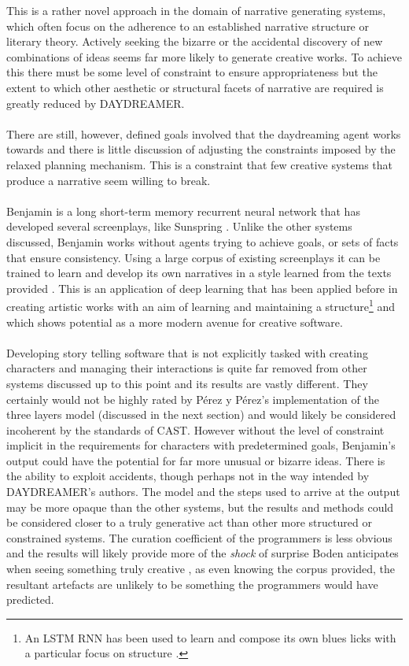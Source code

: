 \documentclass[letterpaper]{article}
\begin{document}
This is a rather novel approach in the domain of narrative generating systems, which often focus on the adherence to an established narrative structure or literary theory. Actively seeking the bizarre or the accidental discovery of new combinations of ideas seems far more likely to generate creative works. To achieve this there must be some level of constraint to ensure appropriateness but the extent to which other aesthetic or structural facets of narrative are required is greatly reduced by DAYDREAMER.\\
\\There are still, however, defined goals involved that the daydreaming agent works towards and there is little discussion of adjusting the constraints imposed by the relaxed planning mechanism. This is a constraint that few creative systems that produce a narrative seem willing to break.\\
\\Benjamin \cite{githubUniverseTalk} is a long short-term memory recurrent neural network that has developed several screenplays, like Sunspring \cite{SunspringScreenplay}. Unlike the other systems discussed, Benjamin works without agents trying to achieve goals, or sets of facts that ensure consistency. Using a large corpus of existing screenplays it can be trained to learn and develop its own narratives in a style learned from the texts provided \cite{githubUniverseTalk}. This is an application of deep learning that has been applied before in creating artistic works with an aim of learning and maintaining a structure\footnote{An LSTM RNN has been used to learn and compose its own blues licks with a particular focus on structure \cite{Eck2002}.} and which shows potential as a more modern avenue for creative software.\\
\\Developing story telling software that is not explicitly tasked with creating characters and managing their interactions is quite far removed from other systems discussed up to this point and its results are vastly different. They certainly would not be highly rated by P\'erez y P\'erez's implementation of the three layers model (discussed in the next section) and would likely be considered incoherent by the standards of CAST. However without the level of constraint implicit in the requirements for characters with predetermined goals, Benjamin's output could have the potential for far more unusual or bizarre ideas. There is the ability to exploit accidents, though perhaps not in the way intended by DAYDREAMER's authors. The model and the steps used to arrive at the output may be more opaque than the other systems, but the results and methods could be considered closer to a truly generative act than other more structured or constrained systems. The curation coefficient of the programmers is less obvious and the results will likely provide more of the \emph{shock} of surprise Boden anticipates when seeing something truly creative \cite{BODEN1998347}, as even knowing the corpus provided, the resultant artefacts are unlikely to be something the programmers would have predicted.\\
\end{document}
